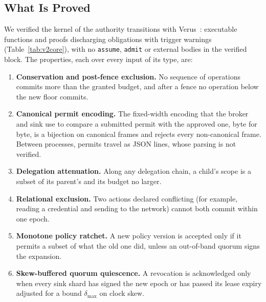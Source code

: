 \subsection{What Is Proved}

We verified the kernel of the authority transitions with Verus~\cite{lattuada2023verus,verus}: \VTwoExecFns{} executable
functions and \VTwoTheorems{} proofs discharging \VTwoProofs{} obligations with \VTwoTriggerWarnings{} trigger warnings
(Table~\ref{tab:v2core}), with no \texttt{assume}, \texttt{admit} or external bodies in the verified block. The
properties, each over every input of its type, are:
\begin{enumerate}
  \item \textbf{Conservation and post-fence exclusion.} No sequence of operations commits more than the granted budget,
        and after a fence no operation below the new floor commits.
  \item \textbf{Canonical permit encoding.} The fixed-width encoding that the broker and sink use to compare a
        submitted permit with the approved one, byte for byte, is a bijection on canonical frames and rejects every
        non-canonical frame. Between processes, permits travel as JSON lines, whose parsing is not verified.
  \item \textbf{Delegation attenuation.} Along any delegation chain, a child's scope is a subset of its parent's and its
        budget no larger.
  \item \textbf{Relational exclusion.} Two actions declared conflicting (for example, reading a credential and sending
        to the network) cannot both commit within one epoch.
  \item \textbf{Monotone policy ratchet.} A new policy version is accepted only if it permits a subset of what the old
        one did, unless an out-of-band quorum signs the expansion.
  \item \textbf{Skew-buffered quorum quiescence.} A revocation is acknowledged only when every sink shard has signed the
        new epoch or has passed its lease expiry adjusted for a bound \(\delta_{\max}\) on clock skew.
\end{enumerate}

